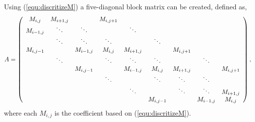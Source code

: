 \documentclass{llncs}
\begin{document}
  Using (\ref{equ:discritizeM}) a five-diagonal block matrix can be created, defined as,
  \begin{equation} \label{equ:five_diagonal_matrix_M}
    A = 
    \left( 
      \begin{array}{c c c c c c c c c c}
        M_{i,j} & M_{i+1,j} &  & M_{i,j+1} &   \\
        M_{i-1,j} & \ddots & \ddots &   &  \ddots &   \\
        & \ddots & \ddots & \ddots & & \ddots & \\
        M_{i,j-1} &  & M_{i-1,j} & M_{i,j} & M_{i+1,j} &   &  M_{i,j+1} &   \\
        & \ddots & & \ddots & \ddots & \ddots & & \ddots\\
        & & M_{i,j-1} &  & M_{i-1,j} & M_{i,j} & M_{i+1,j} &  & M_{i,j+1} \\
        & & & \ddots & & \ddots & \ddots & \ddots & \\
        & & & & \ddots & & \ddots & \ddots & M_{i+1,j} \\
        & & & & & M_{i,j-1} & & M_{i-1,j} & M_{i,j}
      \end{array}
    \right),
  \end{equation}
  where each $M_{i,j}$ is the coefficient based on (\ref{equ:discritizeM}).
 
\end{document}
